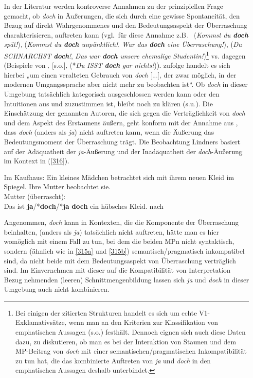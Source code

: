 In der Literatur werden kontroverse Annahmen zu der prinzipiellen Frage gemacht, ob \textit{doch} in Äußerungen, die sich durch eine gewisse Spontaneität, den Bezug auf direkt Wahrgenommenes und den Bedeutungsas\-pekt der Überraschung charakterisieren, auftreten kann (vgl.\ für diese Annahme z.B.\ \citealt[26]{Weydt1969} (\textit{Kommst du \textbf{doch} spät!}), \citealt[37]{Helbig1977} (\textit{Kommst du \textbf{doch} unpünktlich!}, \textit{War das \textbf{doch} eine Überraschung!}), \citealt[116]{Helbig1990} (\textit{Du SCHNARCHST \textbf{doch}!}, \textit{Das war \textbf{doch} unsere ehemalige Studentin!})\footnote{Bei einigen der zitierten Strukturen handelt es sich um echte V1-Exklamativsätze, wenn man an den Kriterien zur Klassifikation von emphatischen Aussagen (s.o.) festhält. Dennoch eignen sich auch diese Daten dazu, zu diskutieren, ob man es bei der Interaktion von Staunen und dem MP-Beitrag von \textit{doch} mit einer semantischen/pragmatischen Inkompatibilität zu tun hat, die das kombinierte Auftreten von \textit{ja} und \textit{doch} in den emphatischen Aussagen deshalb unterbindet.} vs. dagegen \citealt[141]{Hentschel1986} (Beispiele von \citealt[26]{Weydt1969}, \citealt[37]{Helbig1977} [s.o.], \citealt[216]{Rinas2006} (*\textit{Du ISST \textbf{doch} gar nichts!})). \citet[141]{Hentschel1986} zufolge handelt es sich hierbei „um einen veralteten Gebrauch von \textit{doch} [...], der zwar möglich, in der modernen Umgangssprache aber nicht mehr zu beobachten ist“. Ob \textit{doch} in dieser Umgebung tatsächlich kate\-gorisch ausgeschlossen werden kann oder den Intuitionen aus \citet{Weydt1969} und \citet{Helbig1977, Helbig1990} zuzustimmen ist, bleibt noch zu klären (s.u.). Die Einschätzung der genannten Autoren, die sich gegen die Verträglichkeit von \textit{doch} und dem Aspekt des Erstaunens äußern, geht konform mit der Annahme aus \citet[193]{Lindner1991}, dass \textit{doch} (anders als \textit{ja}) nicht auftreten kann, wenn die Äußerung das Bedeutungsmoment der Überraschung trägt. Die Beobachtung Lindners basiert auf der Adäquatheit der \textit{ja}-Äußerung und der Inadäquatheit der \textit{doch}-Äußerung im Kontext in (\ref{316}).  
	         
\begin{exe}
	\ex\label{316} 
	Im Kaufhaus: Ein kleines Mädchen betrachtet sich mit ihrem neuen Kleid im Spiegel. Ihre Mutter beobachtet sie.\\
	Mutter (überrascht):\\
	Das ist \textbf{ja}/*\textbf{doch}/*\textbf{ja doch} ein hübsches Kleid. 
	\hfill\hbox{nach \citet[193]{Lindner1991}}
\end{exe}							
Angenommen, \textit{doch} kann in Kontexten, die die Komponente der Überraschung beinhalten, (anders als \textit{ja}) tatsächlich nicht auftreten, hätte man es hier womöglich mit einem Fall zu tun, bei dem die beiden MPn nicht syntaktisch, sondern (ähnlich wie in \ref{315a} und \ref{315b}) semantisch/pragmatisch inkompatibel sind, da nicht beide mit dem Bedeutungsas\-pekt von Überraschung verträglich sind. Im Einvernehmen mit dieser auf die Kompatibilität von Interpretation Bezug nehmenden (leeren) Schnittmengenbildung lassen sich \textit{ja} und \textit{doch} in dieser Umgebung auch nicht kombinieren.

